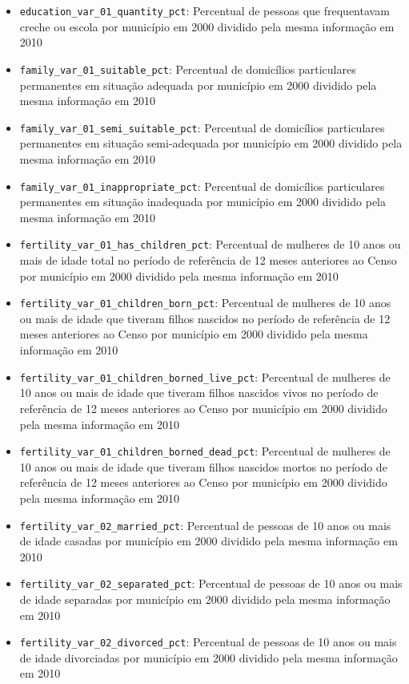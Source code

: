 \begin{itemize}
	\item \verb|education_var_01_quantity_pct|: Percentual de pessoas que frequentavam creche ou escola por município em 2000 dividido pela mesma informação em 2010
	\item \verb|family_var_01_suitable_pct|: Percentual de domicílios particulares permanentes em situação adequada por município em 2000 dividido pela mesma informação em 2010
	\item \verb|family_var_01_semi_suitable_pct|: Percentual de domicílios particulares permanentes em situação semi-adequada por município em 2000 dividido pela mesma informação em 2010
	\item \verb|family_var_01_inappropriate_pct|: Percentual de domicílios particulares permanentes em situação inadequada por município em 2000 dividido pela mesma informação em 2010
	\item \verb|fertility_var_01_has_children_pct|: Percentual de mulheres de 10 anos ou mais de idade total no período de referência de 12 meses anteriores ao Censo por município em 2000 dividido pela mesma informação em 2010
	\item \verb|fertility_var_01_children_born_pct|: Percentual de mulheres de 10 anos ou mais de idade que tiveram filhos nascidos no período de referência de 12 meses anteriores ao Censo por município em 2000 dividido pela mesma informação em 2010
	\item \verb|fertility_var_01_children_borned_live_pct|: Percentual de mulheres de 10 anos ou mais de idade que tiveram filhos nascidos vivos no período de referência de 12 meses anteriores ao Censo por município em 2000 dividido pela mesma informação em 2010
	\item \verb|fertility_var_01_children_borned_dead_pct|: Percentual de mulheres de 10 anos ou mais de idade que tiveram filhos nascidos mortos no período de referência de 12 meses anteriores ao Censo por município em 2000 dividido pela mesma informação em 2010
	\item \verb|fertility_var_02_married_pct|: Percentual de pessoas de 10 anos ou mais de idade casadas por município em 2000 dividido pela mesma informação em 2010
	\item \verb|fertility_var_02_separated_pct|: Percentual de pessoas de 10 anos ou mais de idade separadas por município em 2000 dividido pela mesma informação em 2010
	\item \verb|fertility_var_02_divorced_pct|: Percentual de pessoas de 10 anos ou mais de idade divorciadas por município em 2000 dividido pela mesma informação em 2010

\end{itemize}
